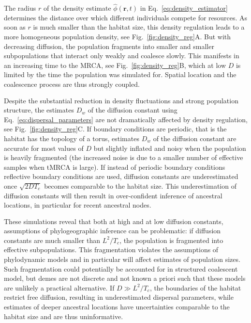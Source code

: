 \documentclass[aps,rmp, twocolumn]{revtex4}
\newcommand{\rvec}{\mathbf{r}}
\begin{document}
The radius $r$ of the density estimate $\hat{\phi}(\rvec, t)$ in Eq.~\ref{eq:density_estimator} determines the distance over which different individuals compete for resources.
As soon as $r$ is much smaller than the habitat size, this density regulation leads to a more homogeneous population density, see Fig.~\ref{fig:density_reg}A.
But with decreasing diffusion, the population fragments into smaller and smaller subpopulations that interact only weakly and coalesce slowly.
This manifests in an increasing time to the MRCA, see Fig.~\ref{fig:density_reg}B, which at low $D$ is limited by the time the population was simulated for.
Spatial location and the coalescence process are thus strongly coupled.

Despite the substantial reduction in density fluctuations and strong population structure, the estimates $D_w$ of the diffusion constant using Eq.~\ref{eq:dispersal_parameters} are not dramatically affected by density regulation, see Fig.~\ref{fig:density_reg}C.
If boundary conditions are periodic, that is the habitat has the topology of a torus, estimates $D_w$ of the diffusion constant are accurate for most values of $D$ but slightly inflated and noisy  when the population is heavily fragmented (the increased noise is due to a smaller number of effective samples when tMRCA is large).
If instead of periodic boundary conditions reflective boundary conditions are used, diffusion constants are underestimated once $\sqrt{2DT_c}$ becomes comparable to the habitat size.
This underestimation of diffusion constants will then result in over-confident inference of ancestral locations, in particular for recent ancestral nodes.

These simulations reveal that both at high and at low diffusion constants, assumptions of phylogeographic inference can be problematic: if diffusion constants are much smaller than $L^2/T_{c}$, the population is fragmented into effective subpopulations. This fragmentation violates the assumptions of phylodynamic models and in particular will affect estimates of population sizes.
Such fragmentation could potentially be accounted for in structured coalescent model, but demes are not discrete and not known a priori such that these models are unlikely a practical alternative.
If $D\gg L^2/T_{c}$, the boundaries of the habitat restrict free diffusion, resulting in underestimated dispersal parameters, while estimates of deeper ancestral locations have uncertainties comparable to the habitat size and are thus uninformative.
\end{document}

